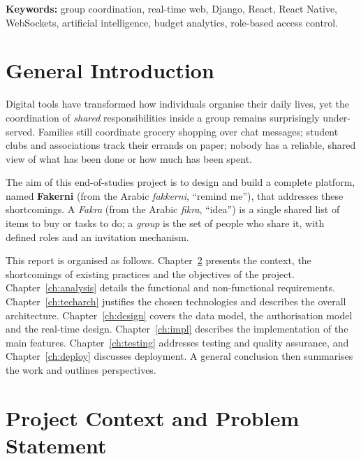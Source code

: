 \documentclass[12pt,a4paper,oneside]{report}
\begin{document}
\vspace{0.4cm}
\noindent\textbf{Keywords:} group coordination, real-time web, Django, React,
React Native, WebSockets, artificial intelligence, budget analytics,
role-based access control.

\tableofcontents
\listoffigures

\chapter{General Introduction}
Digital tools have transformed how individuals organise their daily lives, yet
the coordination of \emph{shared} responsibilities inside a group remains
surprisingly under-served. Families still coordinate grocery shopping over chat
messages; student clubs and associations track their errands on paper; nobody
has a reliable, shared view of what has been done or how much has been spent.

The aim of this end-of-studies project is to design and build a complete
platform, named \textbf{Fakerni} (from the Arabic \emph{fakkerni}, ``remind
me''), that addresses these shortcomings. A \emph{Fakra} (from the Arabic
\emph{fikra}, ``idea'') is a single shared list of items to buy or tasks to do;
a \emph{group} is the set of people who share it, with defined roles and an
invitation mechanism.

This report is organised as follows. Chapter~\ref{ch:context} presents the
context, the shortcomings of existing practices and the objectives of the
project. Chapter~\ref{ch:analysis} details the functional and non-functional
requirements. Chapter~\ref{ch:techarch} justifies the chosen technologies and
describes the overall architecture. Chapter~\ref{ch:design} covers the data
model, the authorisation model and the real-time design. Chapter~\ref{ch:impl}
describes the implementation of the main features. Chapter~\ref{ch:testing}
addresses testing and quality assurance, and Chapter~\ref{ch:deploy} discusses
deployment. A general conclusion then summarises the work and outlines
perspectives.

\chapter{Project Context and Problem Statement}\label{ch:context}
\end{document}
